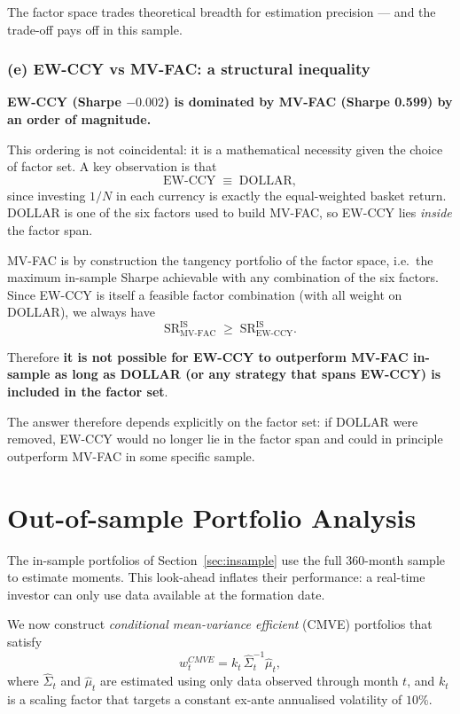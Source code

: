 \documentclass[a4paper,12pt]{article}
\begin{document}
The factor space trades theoretical breadth for estimation precision --- and the trade-off
pays off in this sample.

\subsubsection*{(e) EW-CCY vs MV-FAC: a structural inequality}

\textbf{EW-CCY (Sharpe $-0.002$) is dominated by MV-FAC (Sharpe 0.599) by an order of
magnitude.}

This ordering is not coincidental: it is a mathematical necessity given the choice of
factor set. A key observation is that
\[
    \text{EW-CCY} \;\equiv\; \text{DOLLAR},
\]
since investing $1/N$ in each currency is exactly the equal-weighted basket return.
DOLLAR is one of the six factors used to build MV-FAC, so EW-CCY lies \emph{inside}
the factor span.

MV-FAC is by construction the tangency portfolio of the factor space, i.e.\ the maximum
in-sample Sharpe achievable with any combination of the six factors. Since EW-CCY is itself
a feasible factor combination (with all weight on DOLLAR), we always have
\[
    \mathrm{SR}^{\text{IS}}_{\text{MV-FAC}} \;\ge\; \mathrm{SR}^{\text{IS}}_{\text{EW-CCY}}.
\]

Therefore \textbf{it is not possible for EW-CCY to outperform MV-FAC in-sample as long as
DOLLAR (or any strategy that spans EW-CCY) is included in the factor set}.

The answer therefore depends explicitly on the factor set: if DOLLAR were removed, EW-CCY
would no longer lie in the factor span and could in principle outperform MV-FAC in some
specific sample.

\section{Out-of-sample Portfolio Analysis}
\label{sec:oos}

The in-sample portfolios of Section~\ref{sec:insample} use the full 360-month sample to
estimate moments. This look-ahead inflates their performance: a real-time investor can
only use data available at the formation date.

We now construct \emph{conditional mean-variance efficient} (CMVE) portfolios that satisfy
\begin{equation}
    w^{CMVE}_t = k_t \, \hat{\Sigma}_t^{-1} \hat{\mu}_t,
    \label{eq:cmve}
\end{equation}
where $\hat{\Sigma}_t$ and $\hat{\mu}_t$ are estimated using only data observed through
month $t$, and $k_t$ is a scaling factor that targets a constant ex-ante annualised
volatility of $10\%$.
\end{document}

